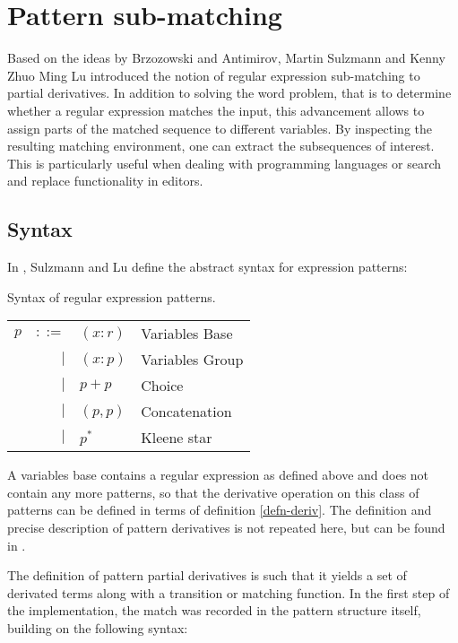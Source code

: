 \section{Pattern sub-matching}

Based on the ideas by Brzozowski and Antimirov, Martin Sulzmann and Kenny Zhuo
Ming Lu introduced the notion of regular expression sub-matching to partial
derivatives. In addition to solving the word problem, that is to determine
whether a regular expression matches the input, this advancement allows to
assign parts of the matched sequence to different variables. By inspecting the
resulting matching environment, one can extract the subsequences of interest.
This is particularly useful when dealing with programming languages or search
and replace functionality in editors.

\subsection{Syntax}

In \cite{pdpat}, Sulzmann and Lu define the abstract syntax for expression
patterns:

\begin{defn}
   \label{defn-pat}
   Syntax of regular expression patterns.

   \begin{tabular}{lrll}
      $p$	& $::=$	& $(x:r)$	& Variables Base	\\
		& $|$	& $(x:p)$	& Variables Group	\\
		& $|$	& $p+p$		& Choice		\\
		& $|$	& $(p,p)$	& Concatenation		\\
		& $|$	& $p^*$		& Kleene star		\\
   \end{tabular}
\end{defn}

A variables base contains a regular expression as defined above and does not
contain any more patterns, so that the derivative operation on this class of
patterns can be defined in terms of definition \ref{defn-deriv}. The definition
and precise description of pattern derivatives is not repeated here, but can be
found in \cite{pdpat}.

The definition of pattern partial derivatives is such that it yields a set of
derivated terms along with a transition or matching function. In the first step
of the implementation, the match was recorded in the pattern structure itself,
building on the following syntax:


